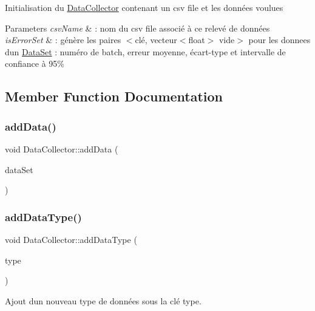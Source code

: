 Initialisation du \hyperlink{classDataCollector}{Data\+Collector} contenant un csv file et les données voulues 
\begin{DoxyParams}{Parameters}
{\em csv\+Name} & \+: nom du csv file associé à ce relevé de données \\
\hline
{\em is\+Error\+Set} & \+: génère les paires $<$clé, vecteur$<$float$>$ vide$>$ pour les donnees d\textquotesingle{}un \hyperlink{classDataSet}{Data\+Set} \+: numéro de batch, erreur moyenne, écart-\/type et intervalle de confiance à 95\% \\
\hline
\end{DoxyParams}


\subsection{Member Function Documentation}
\mbox{\label{classDataCollector_ac0d50d38e3a5107541f929d4ea3a8cb5}} 
\subsubsection{\texorpdfstring{add\+Data()}{addData()}}
{\footnotesize\ttfamily void Data\+Collector\+::add\+Data (\begin{DoxyParamCaption}\item[{\hyperlink{classDataSet}{Data\+Set}}]{data\+Set }\end{DoxyParamCaption})}

\mbox{\label{classDataCollector_a04219510b176548e0fd8eb084bcc1848}} 
\subsubsection{\texorpdfstring{add\+Data\+Type()}{addDataType()}}
{\footnotesize\ttfamily void Data\+Collector\+::add\+Data\+Type (\begin{DoxyParamCaption}\item[{std\+::string}]{type }\end{DoxyParamCaption})}



Ajout d\textquotesingle{}un nouveau type de données sous la clé type. 

